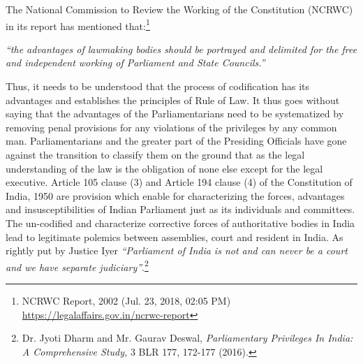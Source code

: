 \begin{multicols}{2}
\noi
The National Commission to Review the Working of the Constitution (NCRWC) in its report
has mentioned that:\footnote{NCRWC Report, 2002 (Jul. 23, 2018, 02:05 PM) \url{https://legalaffairs.gov.in/ncrwc-report}}

\noi
\begin{quoting}
\textit{“the advantages of lawmaking bodies should be portrayed and delimited for the free
and independent working of Parliament and State Councils.”}
\end{quoting}

\noi
Thus, it needs to be understood that the process of codification has its advantages and
establishes the principles of Rule of Law. It thus goes without saying that the advantages of
the Parliamentarians need to be systematized by removing penal provisions for any violations
of the privileges by any common man. Parliamentarians and the greater part of the Presiding
Officials have gone against the transition to classify them on the ground that as the legal
understanding of the law is the obligation of none else except for the legal executive. Article
105 clause (3) and Article 194 clause (4) of the Constitution of India, 1950 are provision
which enable for characterizing the forces, advantages and insusceptibilities of Indian
Parliament just as its individuals and committees. The un-codified and characterize corrective
forces of authoritative bodies in India lead to legitimate polemics between assemblies, court
and resident in India. As rightly put by Justice Iyer \textit{“Parliament of India is not and can never
be a court and we have separate judiciary”}.\footnote{Dr. Jyoti Dharm and Mr. Gaurav Deswal, \textit{Parliamentary Privileges In India: A Comprehensive Study,} 3 BLR 177, 172-177 (2016).}
\end{multicols}
